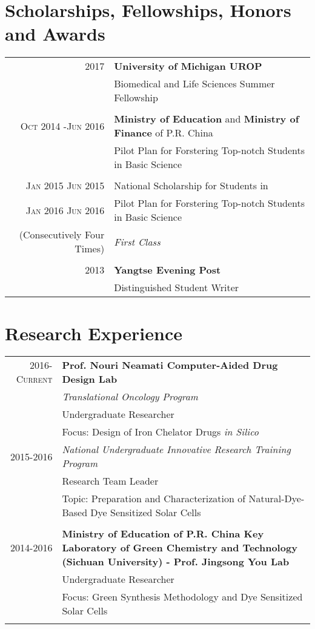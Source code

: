 \documentclass[letterpaper,10pt]{ctexart}
\begin{document}
\section{Scholarships, Fellowships, Honors and Awards}


\begin{tabular}{rl}
\textsc{2017} & \textbf{University of Michigan UROP} \\ &  Biomedical and Life Sciences Summer Fellowship\\\\

\textsc{Oct 2014 -Jun 2016} & \textbf{Ministry of Education} and  \textbf{Ministry of Finance} of P.R. China \\ &Pilot Plan for Forstering Top-notch Students in Basic Science \\\\
 \textsc{Jan} 2015 \textsc{Jun} 2015 & National Scholarship for Students in \\ \textsc{Jan} 2016 \textsc{Jun} 2016 & Pilot Plan for Forstering Top-notch Students in Basic Science \\ \footnotesize(Consecutively Four Times) & \emph{First Class}\\\\
 \textsc 2013 &\textbf{Yangtse Evening Post} \\& Distinguished Student Writer\\
\end{tabular}

\section{Research Experience}
\begin{tabular}{r|p{11cm}}
2016-\textsc{Current} & \textbf{Prof. Nouri Neamati Computer-Aided Drug Design Lab} \\ &\emph{Translational Oncology Program}\\&Undergraduate Researcher\\ & Focus: Design of Iron Chelator Drugs \emph{in Silico} \multicolumn{2}{c}{}\\


2015-2016 &  \emph{National Undergraduate Innovative Research Training Program} \\& Research Team Leader \\& Topic: Preparation and Characterization of Natural-Dye-Based Dye Sensitized Solar Cells\\\multicolumn{2}{c}{}\\

\textsc{2014-2016} &  \textbf{Ministry of Education of P.R. China Key Laboratory of Green Chemistry and Technology (Sichuan University) - Prof. Jingsong You Lab}\\& Undergraduate Researcher \\& Focus: Green Synthesis Methodology and Dye Sensitized Solar Cells\\\multicolumn{2}{c}{}\\

\end{tabular}
\end{document}
